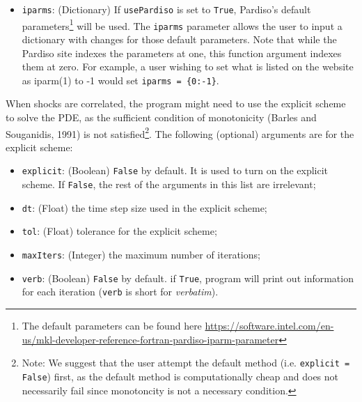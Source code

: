 \documentclass[12pt]{article}
\begin{document}
\begin{itemize}
\item \texttt{iparms}: (Dictionary) If \texttt{usePardiso} is set to \texttt{True}, Pardiso's default parameters\footnote{The default parameters can be found here \href{https://software.intel.com/en-us/mkl-developer-reference-fortran-pardiso-iparm-parameter}{https://software.intel.com/en-us/mkl-developer-reference-fortran-pardiso-iparm-parameter}} will be used. The \texttt{iparms} parameter
allows the user to input a dictionary with changes for those default parameters.
Note that while the Pardiso site indexes the parameters at one, this function
argument indexes them at zero. For example, a user wishing to set what is listed
on the website as iparm(1) to -1 would set \texttt{iparms = \{0:-1\}}.
\end{itemize}

When shocks are correlated, the program might need to use the explicit scheme to solve the PDE, as the sufficient condition of monotonicity (Barles and Souganidis, 1991) is not satisfied\footnote{Note: We suggest that the user attempt the default method (i.e. \texttt{explicit = False}) first, as the default method is computationally cheap and does not necessarily fail since monotoncity is not a necessary condition.}.  The following (optional) arguments are for the explicit scheme:

\begin{itemize}
    \item \texttt{explicit}: (Boolean) \texttt{False} by default. It is used to turn on the explicit scheme. If \texttt{False}, the rest of the arguments in this list are irrelevant;
    \item \texttt{dt}: (Float) the time step size used in the explicit scheme;
    \item \texttt{tol}: (Float) tolerance for the explicit scheme;
    \item \texttt{maxIters}: (Integer) the maximum number of iterations;
    \item \texttt{verb}: (Boolean) \texttt{False} by default. if \texttt{True}, program will print out information for each iteration (\texttt{verb} is short for \textit{verbatim}).
\end{itemize}
\end{document}
